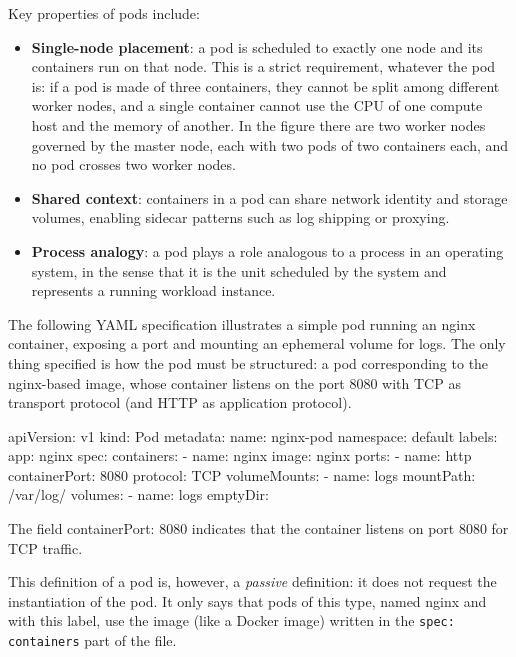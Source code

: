 \begin{center}
\end{center}

Key properties of pods include:

\begin{itemize}
\item \textbf{Single-node placement}: a pod is scheduled to exactly one node and its containers run on that node. This is a strict requirement, whatever the pod is: if a pod is made of three containers, they cannot be split among different worker nodes, and a single container cannot use the CPU of one compute host and the memory of another. In the figure there are two worker nodes governed by the master node, each with two pods of two containers each, and no pod crosses two worker nodes.
\item \textbf{Shared context}: containers in a pod can share network identity and storage volumes, enabling sidecar patterns such as log shipping or proxying.
\item \textbf{Process analogy}: a pod plays a role analogous to a process in an operating system, in the sense that it is the unit scheduled by the system and represents a running workload instance.
\end{itemize}

The following YAML specification illustrates a simple pod running an nginx container, exposing a port and mounting an ephemeral volume for logs. The only thing specified is how the pod must be structured: a pod corresponding to the nginx-based image, whose container listens on the port 8080 with TCP as transport protocol (and HTTP as application protocol).

\begin{codeblock}
apiVersion: v1
kind: Pod
metadata:
  name: nginx-pod
  namespace: default
  labels:
    app: nginx
spec:
  containers:
    - name: nginx
      image: nginx
      ports:
        - name: http
          containerPort: 8080
          protocol: TCP
      volumeMounts:
        - name: logs
          mountPath: /var/log/
  volumes:
    - name: logs
      emptyDir: {}
\end{codeblock}

The field containerPort: 8080 indicates that the container listens on port 8080 for TCP traffic.

This definition of a pod is, however, a \emph{passive} definition: it does not request the instantiation of the pod. It only says that pods of this type, named nginx and with this label, use the image (like a Docker image) written in the \texttt{spec: containers} part of the file.

